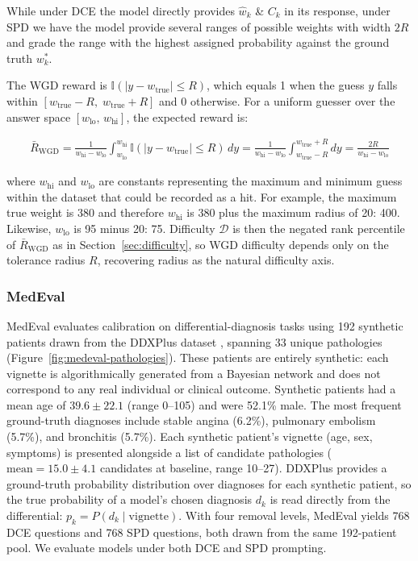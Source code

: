 \documentclass{article}
\begin{document}
While under DCE the model directly provides $\hat{w}_k$ \& $C_k$ in its response, under SPD we have the model provide several ranges of possible weights with width $2R$ and grade the range with the highest assigned probability against the ground truth $w^*_k$. 


The WGD reward is $\mathbb{I}(|y - w_{\text{true}}| \leq R)$, which equals 1 when the guess $y$ falls within $[w_{\text{true}} - R,\; w_{\text{true}} + R]$ and 0 otherwise. For a uniform guesser over the answer space $[w_{\text{lo}},\, w_{\text{hi}}]$, the expected reward is:

\begin{align}
    \bar{R}_{\text{WGD}} = \frac{1}{w_{\text{hi}} - w_{\text{lo}}} \int_{w_{\text{lo}}}^{w_{\text{hi}}} \mathbb{I}(|y - w_{\text{true}}| \leq R)\, dy = \frac{1}{w_{\text{hi}} - w_{\text{lo}}} \int_{w_{\text{true}} - R}^{w_{\text{true}} + R} dy = \frac{2R}{w_{\text{hi}} - w_{\text{lo}}}
\end{align}

where $w_{\text{hi}}$ and $w_{\text{lo}}$ are constants representing the maximum and minimum guess within the dataset that could be recorded as a hit. For example, the maximum true weight is 380 and therefore $w_{\text{hi}}$ is 380 plus the maximum radius of 20: 400. Likewise,   $w_{\text{lo}}$ is 95 minus 20: 75. Difficulty $\mathcal{D}$ is then the negated rank percentile of $\bar{R}_{\text{WGD}}$ as in Section~\ref{sec:difficulty}, so WGD difficulty depends only on the tolerance radius $R$, recovering radius as the natural difficulty axis.

\subsubsection{MedEval}
\label{sec:medeval}

MedEval evaluates calibration on differential-diagnosis tasks using 192 synthetic patients drawn from the DDXPlus dataset \citep{ddx}, spanning 33 unique pathologies (Figure~\ref{fig:medeval-pathologies}). These patients are entirely synthetic: each vignette is algorithmically generated from a Bayesian network and does not correspond to any real individual or clinical outcome. Synthetic patients had a mean age of $39.6 \pm 22.1$ (range 0--105) and were 52.1\% male. The most frequent ground-truth diagnoses include stable angina (6.2\%), pulmonary embolism (5.7\%), and bronchitis (5.7\%). Each synthetic patient's vignette (age, sex, symptoms) is presented alongside a list of candidate pathologies ($\text{mean} = 15.0 \pm 4.1$ candidates at baseline, range 10--27). DDXPlus provides a ground-truth probability distribution over diagnoses for each synthetic patient, so the true probability of a model's chosen diagnosis $d_k$ is read directly from the differential: $p_k = P(d_k \mid \text{vignette})$. With four removal levels, MedEval yields 768 DCE questions and 768 SPD questions, both drawn from the same 192-patient pool. We evaluate models under both DCE and SPD prompting.
\end{document}
